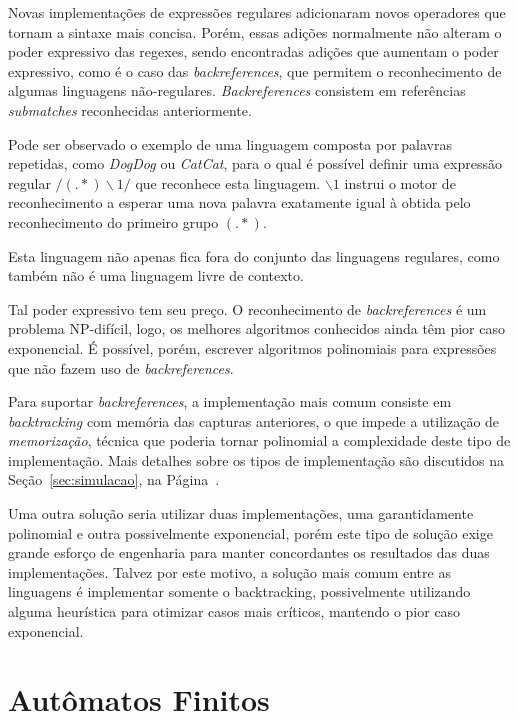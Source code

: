 \documentclass[a4paper,12pt,oneside,onecolumn]{uerj}
\begin{document}
Novas implementações de expressões regulares adicionaram novos operadores que tornam a sintaxe mais concisa. Porém, essas adições normalmente não alteram o poder expressivo das regexes, sendo encontradas adições que aumentam o poder expressivo, como é o caso das \emph{backreferences}, que permitem o reconhecimento de algumas linguagens não-regulares. \emph{Backreferences} consistem em referências \emph{submatches} reconhecidas anteriormente.

Pode ser observado o exemplo de uma linguagem composta por palavras repetidas, como \emph{DogDog} ou \emph{CatCat}, para o qual é possível definir uma expressão regular $/(.*)\backslash 1/$ que reconhece esta linguagem. $\backslash 1$ instrui o motor de reconhecimento a esperar uma nova palavra exatamente igual à obtida pelo reconhecimento do primeiro grupo $(.*)$.

Esta linguagem não apenas fica fora do conjunto das linguagens regulares, como também não é uma linguagem livre de contexto.

Tal poder expressivo tem seu preço. O reconhecimento de \emph{backreferences} é um problema NP-difícil, logo, os melhores algoritmos conhecidos ainda têm pior caso exponencial. É possível, porém, escrever algoritmos polinomiais para expressões que não fazem uso de \emph{backreferences}.

Para suportar \emph{backreferences}, a implementação mais comum consiste em \emph{backtracking} com memória das capturas anteriores, o que impede a utilização de \emph{memorização}, técnica que poderia tornar polinomial a complexidade deste tipo de implementação. Mais detalhes sobre os tipos de implementação são discutidos na Seção~\ref{sec:simulacao}, na Página~\pageref{sec:simulacao}.

Uma outra solução seria utilizar duas implementações, uma garantidamente polinomial e outra possivelmente exponencial, porém este tipo de solução exige grande esforço de engenharia para manter concordantes os resultados das duas implementações. Talvez por este motivo, a solução mais comum entre as linguagens é implementar somente o backtracking, possivelmente utilizando alguma heurística para otimizar casos mais críticos, mantendo o pior caso exponencial.

\section{Autômatos Finitos}
\end{document}
